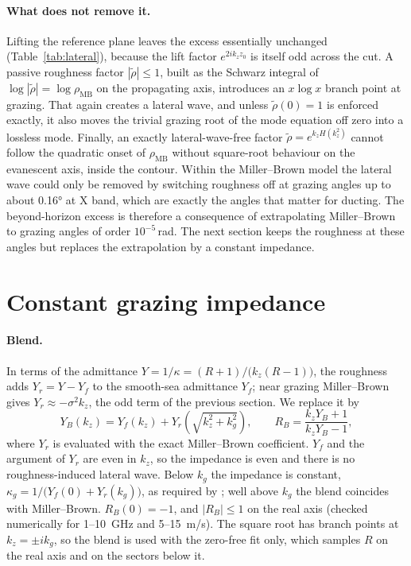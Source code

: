 \documentclass[11pt,a4paper]{article}
\newcommand{\kz}{k_z}
\newcommand{\rhoMB}{\rho_{\mathrm{MB}}}
\begin{document}
\paragraph{What does not remove it.}
Lifting the reference plane leaves the excess essentially unchanged (Table~\ref{tab:lateral}),
because the lift factor $e^{2i\kz z_0}$ is itself odd across the cut. A passive
roughness factor $|\tilde\rho|\le1$, built as the Schwarz integral of
$\log|\tilde\rho|=\log\rhoMB$ on the propagating axis, introduces an
$x\log x$ branch point at grazing. That again creates a lateral wave, and unless
$\tilde\rho(0)=1$ is enforced exactly, it also moves the trivial grazing root of the
mode equation off zero into a lossless mode. Finally, an exactly
lateral-wave-free factor $\tilde\rho=e^{\kz H(\kz^2)}$ cannot follow the quadratic
onset of $\rhoMB$ without square-root behaviour on the evanescent axis, inside the
contour. Within the Miller--Brown model the lateral wave could only be removed by
switching roughness off at grazing angles up to about \ang{0.16} at X band, which
are exactly the angles that matter for ducting. The beyond-horizon excess is
therefore a consequence of extrapolating Miller--Brown to grazing angles of order
$10^{-5}$\,rad. The next section keeps the roughness at these angles but replaces
the extrapolation by a constant impedance.

\section{Constant grazing impedance}\label{sec:barrick}

\paragraph{Blend.}
In terms of the admittance $Y=1/\kappa=(R+1)/\bigl(\kz(R-1)\bigr)$, the roughness
adds $Y_r=Y-Y_f$ to the smooth-sea admittance $Y_f$; near grazing Miller--Brown
gives $Y_r\approx-\sigma^2\kz$, the odd term of the previous section. We replace it by
\begin{equation}
  Y_B(\kz)=Y_f(\kz)+Y_r\!\left(\sqrt{\kz^2+k_g^2}\right),\qquad
  R_B=\frac{\kz Y_B+1}{\kz Y_B-1},
\end{equation}
where $Y_r$ is evaluated with the exact Miller--Brown coefficient. $Y_f$ and the
argument of $Y_r$ are even in $\kz$, so the impedance is even and there is no
roughness-induced lateral wave. Below $k_g$ the impedance is constant,
$\kappa_g=1/\bigl(Y_f(0)+Y_r(k_g)\bigr)$, as required by \cite{barrick1998}; well
above $k_g$ the blend coincides with Miller--Brown. $R_B(0)=-1$, and
$|R_B|\le1$ on the real axis (checked numerically for 1--\SI{10}{GHz} and
5--\SI{15}{m/s}). The square root has branch points at $\kz=\pm ik_g$, so the
blend is used with the zero-free fit only, which samples $R$ on the real axis and
on the sectors below it.
\end{document}
